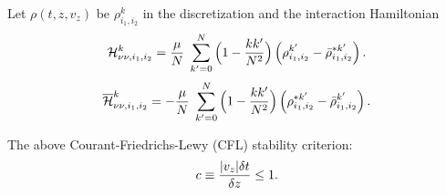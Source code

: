\documentclass[11pt,a4paper]{article}
\begin{document}
\noindent Let $\rho(t,z, v_{z})$ be $\rho^{k}_{i_1, i_2}$ in the discretization and the interaction Hamiltonian\\
\[
\mathcal{H}^{k}_{\nu\nu, i_1, i_2}  = \frac{\mu}{N} \hspace{0.1cm}\sum_{k'=0}^{N} \Big(1 - \frac{kk'}{N^{2}}\Big) \left( \rho^{k'}_{i_1, i_2} - \bar\rho^{*k'}_{i_1, i_2}\right).\] 
\[
\overline{\mathcal{H}}^{k}_{\nu\nu, i_1, i_2}  = -\frac{\mu}{N} \hspace{0.1cm}\sum_{k'=0}^{N} \Big(1 - \frac{kk'}{N^{2}}\Big) \left( \rho^{*k'}_{i_1, i_2} - \bar\rho^{k'}_{i_1, i_2}\right).\] 



\noindent The above Courant-Friedrichs-Lewy (CFL) stability criterion:
\[
c \equiv \frac{\abs{v_{z}}\delta t}{\delta z}\leq 1 .\] 
\end{document}
